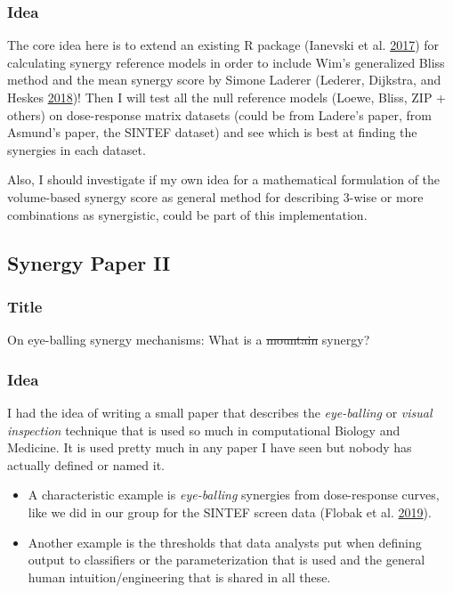 \documentclass[
  12pt,
]{book}
\providecommand{\tightlist}{%
  \setlength{\itemsep}{0pt}\setlength{\parskip}{0pt}}
\begin{document}
\hypertarget{idea-1}{%
\subsubsection*{Idea}\label{idea-1}}

The core idea here is to extend an existing R package (Ianevski et al. \protect\hyperlink{ref-Ianevski2017}{2017}) for calculating synergy reference models in order to include Wim's generalized Bliss method and the mean synergy score by Simone Laderer (Lederer, Dijkstra, and Heskes \protect\hyperlink{ref-Lederer2018}{2018})!
Then I will test all the null reference models (Loewe, Bliss, ZIP + others) on dose-response matrix datasets (could be from Ladere's paper, from Asmund's paper, the SINTEF dataset) and see which is best at finding the synergies in each dataset.

Also, I should investigate if my own idea for a mathematical formulation of the volume-based synergy score as general method for describing 3-wise or more combinations as synergistic, could be part of this implementation.

\hypertarget{synergy-paper-ii}{%
\subsection*{Synergy Paper II}\label{synergy-paper-ii}}

\hypertarget{title-1}{%
\subsubsection*{Title}\label{title-1}}

On eye-balling synergy mechanisms: What is a \sout{mountain} synergy?

\hypertarget{idea-2}{%
\subsubsection*{Idea}\label{idea-2}}

I had the idea of writing a small paper that describes the \emph{eye-balling} or \emph{visual inspection} technique that is used so much in computational Biology and Medicine.
It is used pretty much in any paper I have seen but nobody has actually defined or named it.

\begin{itemize}
\tightlist
\item
  A characteristic example is \emph{eye-balling} synergies from dose-response curves, like we did in our group for the SINTEF screen data (Flobak et al. \protect\hyperlink{ref-Flobak2019}{2019}).
\item
  Another example is the thresholds that data analysts put when defining output to classifiers or the parameterization that is used and the general human intuition/engineering that is shared in all these.
\end{itemize}
\end{document}
